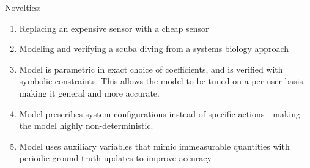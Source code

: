 \documentclass[sigconf,screen]{acmart}
\begin{document}
Novelties:
\begin{enumerate}
    \item Replacing an expensive sensor with a cheap sensor
    \item Modeling and verifying a scuba diving from a systems biology approach
    \item Model is parametric in exact choice of coefficients, and is verified with symbolic constraints. This allows the model to be tuned on a per user basis, making it general and more accurate.
    \item Model prescribes system configurations instead of specific actions - making the model highly non-deterministic.
    \item Model uses auxiliary variables that mimic immeasurable quantities with periodic ground truth updates to improve accuracy 
\end{enumerate}
    



 
 


\end{document}
